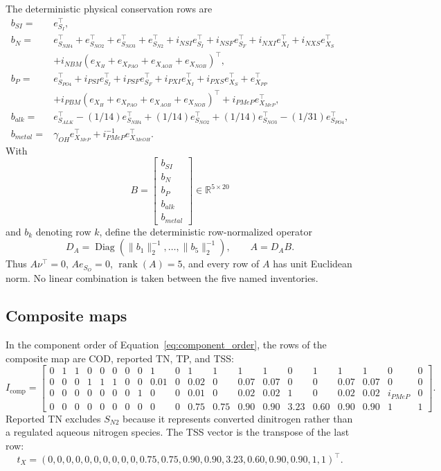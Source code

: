\documentclass[a4paper,fleqn]{cas-sc}
\newcommand{\R}{\mathbb{R}}
\newcommand{\diag}{\operatorname{Diag}}
\begin{document}
The deterministic physical conservation rows are
\begin{align}
b_{SI}={}&e_{S_I}^\top,\\
b_N={}&e_{S_{NH4}}^\top+e_{S_{NO2}}^\top+e_{S_{NO3}}^\top+e_{S_{N2}}^\top+i_{NSI}e_{S_I}^\top+i_{NSF}e_{S_F}^\top
+i_{NXI}e_{X_I}^\top+i_{NXS}e_{X_S}^\top\\
&+i_{NBM}(e_{X_H}+e_{X_{PAO}}+e_{X_{AOB}}+e_{X_{NOB}})^\top,\\
b_P={}&e_{S_{PO4}}^\top+i_{PSI}e_{S_I}^\top+i_{PSF}e_{S_F}^\top+i_{PXI}e_{X_I}^\top+i_{PXS}e_{X_S}^\top+e_{X_{PP}}^\top\\
&+i_{PBM}(e_{X_H}+e_{X_{PAO}}+e_{X_{AOB}}+e_{X_{NOB}})^\top+i_{PMeP}e_{X_{MeP}}^\top,\\
b_{alk}={}&e_{S_{ALK}}^\top-(1/14)e_{S_{NH4}}^\top+(1/14)e_{S_{NO2}}^\top+(1/14)e_{S_{NO3}}^\top-(1/31)e_{S_{PO4}}^\top,\\
b_{metal}={}&\gamma_{OH}e_{X_{MeP}}^\top+i_{PMeP}^{-1}e_{X_{MeOH}}^\top.
\end{align}
With
\begin{equation}
B=\begin{bmatrix}b_{SI}\\b_N\\b_P\\b_{alk}\\b_{metal}\end{bmatrix}\in\R^{5\times20}
\end{equation}
and $b_k$ denoting row $k$, define the deterministic row-normalized operator
\begin{equation}
D_A=\diag(\|b_1\|_2^{-1},\ldots,\|b_5\|_2^{-1}),
\qquad A=D_AB.
\end{equation}
Thus $A\nu^\top=0$, $Ae_{S_O}=0$, $\operatorname{rank}(A)=5$, and every row of $A$ has unit Euclidean norm. No linear combination is taken between the five named inventories.

\subsection{Composite maps}

In the component order of Equation~\eqref{eq:component_order}, the rows of the composite map are COD, reported TN, TP, and TSS:
{\scriptsize
\begin{equation}
\label{eq:exact_composite_matrix}
I_{\mathrm{comp}}=\begin{bmatrix}
0&1&1&0&0&0&0&0&1&0&1&1&1&1&0&1&1&1&0&0\\
0&0&0&1&1&1&0&0&0.01&0&0.02&0&0.07&0.07&0&0&0.07&0.07&0&0\\
0&0&0&0&0&0&0&1&0&0&0.01&0&0.02&0.02&1&0&0.02&0.02&i_{PMeP}&0\\
0&0&0&0&0&0&0&0&0&0&0.75&0.75&0.90&0.90&3.23&0.60&0.90&0.90&1&1
\end{bmatrix}.
\end{equation}
}
Reported TN excludes $S_{N2}$ because it represents converted dinitrogen rather than a regulated aqueous nitrogen species. The TSS vector is the transpose of the last row:
\begin{equation}
t_X=(0,0,0,0,0,0,0,0,0,0,0.75,0.75,0.90,0.90,3.23,0.60,0.90,0.90,1,1)^\top.
\end{equation}
\end{document}
